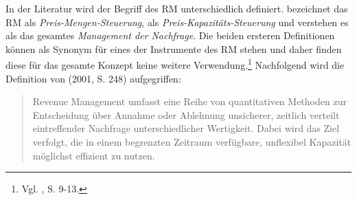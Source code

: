 
In der Literatur wird der Begriff des RM unterschiedlich definiert. \cite{friege1996yield} bezeichnet das RM als \textit{Preis-Mengen-Steuerung}, \cite{daudel1992yield} als \textit{Preis-Kapazitäts-Steuerung} und \cite{talluri2004theory} verstehen es als das gesamtes \textit{Management der Nachfrage}. Die beiden ersteren Definitionen können als Synonym für eines der Instrumente des RM stehen und daher finden diese für das gesamte Konzept keine weitere Verwendung.\footnote{Vgl. \cite{Petrick:2009aa}, S. 9-13.} Nachfolgend wird die Definition von \citeauthor{klein2001revenue} (2001, S. 248) aufgegriffen:

\begin{quote}
\glqq Revenue Management umfasst eine Reihe von quantitativen Methoden zur Entscheidung über Annahme oder Ablehnung unsicherer, zeitlich verteilt eintreffender Nachfrage unterschiedlicher Wertigkeit. Dabei wird das Ziel verfolgt, die in einem begrenzten Zeitraum verfügbare, unflexibel Kapazität möglichst effizient zu nutzen.\grqq
\end{quote}

